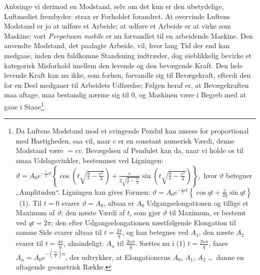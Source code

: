 \documentclass[12pt,a4paper]{book}
\begin{document}
Anbringe vi derimod en Modstand, selv om det kun er den ubetydelige,
Luftmediet frembyder: strax er Forholdet forandret. At overvinde Luftens
Modstand er jo at udføre et Arbeide; at udføre et Arbeide er at virke som
Maskine: vort \textit{Perpetuum mobile} er nu forvandlet til en
arbeidende Maskine. Den anvendte Modstand, det paalagte Arbeide, vil,
hvor lang Tid der end kan medgaae, inden den fuldkomne Standsning
indtræder, dog øieblikkelig bevirke et kategorisk Misforhold imellem den
levende og den bevægende Kraft. Den hele levende Kraft kan nu ikke, som
forhen, forvandle sig til Bevægekraft, efterdi den for en Deel medgaaer
til Arbeidets Udførelse; Følgen heraf er, at Bevægekraften maa aftage,
maa bestandig nærme sig til 0, og Maskinen være i Begreb med at gaae i
Staae\footnote{Da Luftens Modstand mod et svingende Pendul kan ansees for
proportional med Hastigheden, saa vil, naar $c$ er en constant numerisk
Værdi, denne Modstand være $= cv$. Bevægelsen af Pendulet kan da, naar vi
holde os til smaa Udslagsvinkler, bestemmes ved Ligningen:
$\vartheta = A_0 e^{-\frac{1}{2}ct}\left\lbrace \cos\left(t\sqrt{\frac{g}{r}
- \frac{c^2}{4}}\right) + \frac{c}{2\sqrt{\frac{g}{r} - \frac{c^2}{4}}}
\sin\left(t\sqrt{\frac{g}{r} - \frac{c^2}{4}}\right)\right\rbrace,$
hvor $\vartheta$ betegner „Amplituden“. Ligningen kan gives Formen:
$\vartheta = A_0 e^{-\frac{1}{2}ct}\left\lbrace\cos qt + \frac{c}{2q}
\sin qt\right\rbrace$ \ (1).
Til $t = 0$ svarer $\vartheta = A_0$, altsaa er $A_0$
Udgangselongationen og tillige et Maximum af $\vartheta$; den næste Værdi
af $t$, som gjør $\vartheta$ til Maximum, er bestemt ved $qt = 2\pi$; den
efter Udgangselongationen næstfølgende Elongation til samme Side svarer
altsaa til $t = \frac{2\pi}{q}$, og kan betegnes ved $A_1$, den næste
$A_2$ svarer til $t = \frac{4\pi}{q}$, almindeligt: $A_n$ til
$\frac{2n\pi}{q}$. Sættes nu i (1) $t = \frac{2n\pi}{q}$, faaes $A_n =
A_0 e^{-\left(\frac{\pi c}{q}\right)n}$, der udtrykker, at Elongationerne
$A_0$, $A_1$, $A_2$ \ldots\ danne en aftagende geometrisk Række.}.
\end{document}
